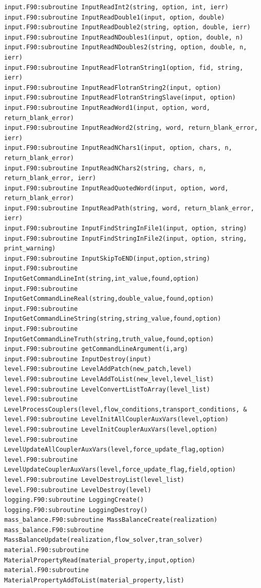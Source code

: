 \documentclass[12pt]{article}
\begin{document}
\begin{verbatim}
input.F90:subroutine InputReadInt2(string, option, int, ierr)
input.F90:subroutine InputReadDouble1(input, option, double)
input.F90:subroutine InputReadDouble2(string, option, double, ierr)
input.F90:subroutine InputReadNDoubles1(input, option, double, n)
input.F90:subroutine InputReadNDoubles2(string, option, double, n, ierr)
input.F90:subroutine InputReadFlotranString1(option, fid, string, ierr)
input.F90:subroutine InputReadFlotranString2(input, option)
input.F90:subroutine InputReadFlotranStringSlave(input, option)
input.F90:subroutine InputReadWord1(input, option, word, return_blank_error)
input.F90:subroutine InputReadWord2(string, word, return_blank_error, ierr)
input.F90:subroutine InputReadNChars1(input, option, chars, n, return_blank_error)
input.F90:subroutine InputReadNChars2(string, chars, n, return_blank_error, ierr)
input.F90:subroutine InputReadQuotedWord(input, option, word, return_blank_error)
input.F90:subroutine InputReadPath(string, word, return_blank_error, ierr)
input.F90:subroutine InputFindStringInFile1(input, option, string)
input.F90:subroutine InputFindStringInFile2(input, option, string, print_warning)
input.F90:subroutine InputSkipToEND(input,option,string)
input.F90:subroutine InputGetCommandLineInt(string,int_value,found,option)
input.F90:subroutine InputGetCommandLineReal(string,double_value,found,option)
input.F90:subroutine InputGetCommandLineString(string,string_value,found,option)
input.F90:subroutine InputGetCommandLineTruth(string,truth_value,found,option)
input.F90:subroutine getCommandLineArgument(i,arg)
input.F90:subroutine InputDestroy(input)
level.F90:subroutine LevelAddPatch(new_patch,level)
level.F90:subroutine LevelAddToList(new_level,level_list)
level.F90:subroutine LevelConvertListToArray(level_list)
level.F90:subroutine LevelProcessCouplers(level,flow_conditions,transport_conditions, &
level.F90:subroutine LevelInitAllCouplerAuxVars(level,option)
level.F90:subroutine LevelInitCouplerAuxVars(level,option)
level.F90:subroutine LevelUpdateAllCouplerAuxVars(level,force_update_flag,option)
level.F90:subroutine LevelUpdateCouplerAuxVars(level,force_update_flag,field,option)
level.F90:subroutine LevelDestroyList(level_list)
level.F90:subroutine LevelDestroy(level)
logging.F90:subroutine LoggingCreate()
logging.F90:subroutine LoggingDestroy()
mass_balance.F90:subroutine MassBalanceCreate(realization)
mass_balance.F90:subroutine MassBalanceUpdate(realization,flow_solver,tran_solver)
material.F90:subroutine MaterialPropertyRead(material_property,input,option)
material.F90:subroutine MaterialPropertyAddToList(material_property,list)

\end{verbatim}
\end{document}
